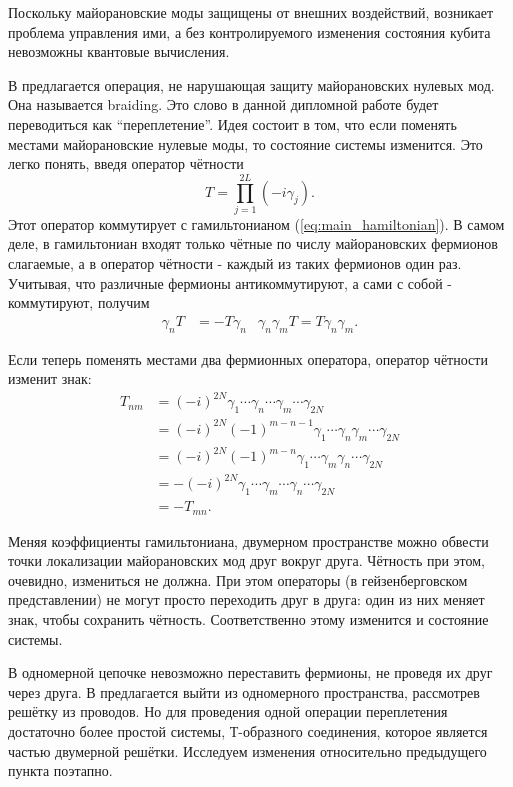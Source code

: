 \documentclass[a4paper,12pt]{article}
\theoremstyle{plain} %
\theoremstyle{definition} %
\theoremstyle{remark} %
\begin{document}
Поскольку майорановские моды защищены от внешних воздействий, возникает проблема управления ими, а без контролируемого изменения состояния кубита невозможны квантовые вычисления.

В \cite{braiding} предлагается операция, не нарушающая защиту майорановских нулевых мод. Она называется braiding. Это слово в данной дипломной работе будет переводиться как ``переплетение''. Идея состоит в том, что если поменять местами майорановские нулевые моды, то состояние системы изменится. Это легко понять, введя оператор чётности
\begin{equation}
T = \prod\limits_{j=1}^{2L} (-i \gamma_j).
\end{equation}
Этот оператор коммутирует с гамильтонианом (\ref{eq:main_hamiltonian}). В самом деле, в гамильтониан входят только чётные по числу майорановских фермионов слагаемые, а в оператор чётности - каждый из таких фермионов один раз. Учитывая, что различные фермионы антикоммутируют, а сами с собой - коммутируют, получим
\begin{align}
\gamma_n T &= - T \gamma_n & \gamma_n \gamma_m T = T \gamma_n \gamma_m.
\end{align}

Если теперь поменять местами два фермионных оператора, оператор чётности изменит знак:
\begin{equation}
\begin{split}
T_{nm} &= (-i)^{2N} \gamma_1 \dotsm \gamma_n \dotsm \gamma_m \dotsm \gamma_{2N} \\
    &= (-i)^{2N} (-1)^{m-n-1} \gamma_1 \dotsm \gamma_n \gamma_m \dotsm \gamma_{2N} \\ &= (-i)^{2N} (-1)^{m-n} \gamma_1 \dotsm \gamma_m \gamma_n \dotsm \gamma_{2N} \\
    &= - (-i)^{2N} \gamma_1 \dotsm \gamma_m \dotsm \gamma_n \dotsm \gamma_{2N} \\
    &= - T_{mn}.
\end{split}
\end{equation}

Меняя коэффициенты гамильтониана, двумерном пространстве можно обвести точки локализации майорановских мод друг вокруг друга. Чётность при этом, очевидно, измениться не должна. При этом операторы (в гейзенберговском представлении) не могут просто переходить друг в друга: один из них меняет знак, чтобы сохранить чётность. Соответственно этому изменится и состояние системы.

В одномерной цепочке невозможно переставить фермионы, не проведя их друг через друга. В \cite{braiding} предлагается выйти из одномерного пространства, рассмотрев решётку из проводов. Но для проведения одной операции переплетения достаточно более простой системы, Т-образного соединения, которое является частью двумерной решётки. Исследуем изменения относительно предыдущего пункта поэтапно.
\end{document}
